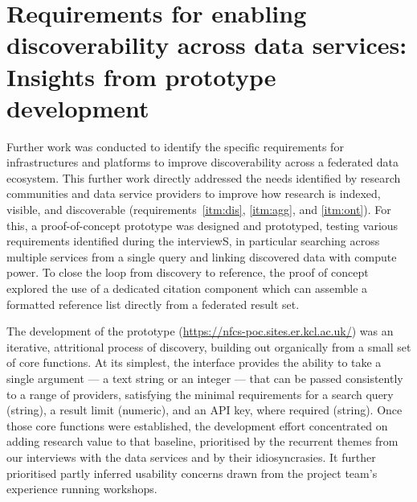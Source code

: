 \documentclass[11pt]{scrartcl}
\begin{document}
\section{Requirements for enabling discoverability across data services: Insights from prototype development}
Further work was conducted to identify the specific requirements for infrastructures and platforms to improve discoverability across a federated data ecosystem. 
This further work directly addressed the needs identified by research communities and data service providers to improve how research is indexed, visible, and discoverable (requirements~\ref{itm:dis}, \ref{itm:agg}, and \ref{itm:ont}). For this, a proof-of-concept prototype was designed and prototyped, testing various requirements identified during the interviewS, in particular searching across multiple services from a single query and linking discovered data with compute power. To close the loop from discovery to reference, the proof of concept explored the use of a dedicated citation component which can assemble a formatted reference list directly from a federated result set.

The development of the prototype (\url{https://nfcs-poc.sites.er.kcl.ac.uk/}) was an iterative, attritional process of discovery, building out organically from a small set of core functions. At its simplest, the interface provides the ability to take a single argument — a text string or an integer — that can be passed consistently to a range of providers, satisfying the minimal requirements for a search query (string), a result limit (numeric), and an API key, where required (string). Once those core functions were established, the development effort concentrated on adding research value to that baseline, prioritised by the recurrent themes from our interviews with the data services and by their idiosyncrasies. It further prioritised partly inferred usability concerns drawn from the project team's experience running workshops.
\end{document}
